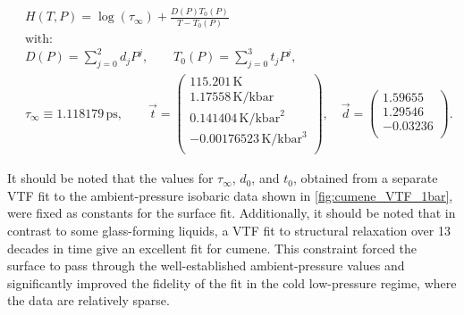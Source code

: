 \begin{equation}
	\label{eqn:VTFsurface}
	\begin{split}
		\:& H\left(T,P\right) = \log(\tau_{\infty}) +\frac{D(P)T_{0}(P)}{T-T_{0}(P)}\\
		&\text{with:}\\
		&D(P)=\sum_{j=0}^{2}d_{j}P^{j}, \qquad T_{0}(P)=\sum_{j=0}^{3}t_{j}P^{j},\\
		&\tau_{\infty}\equiv 1.118179 \,\si{\pico\second},\qquad
		\vec{t}=\begin{pmatrix}
			115.201 \,\si{\kelvin}\\
			1.17558 \,\si{\kelvin\per\kilo\bar}\\ 
			0.141404\,\si{\kelvin\per\kilo\bar\squared}\\ 
			-0.00176523\,\si{\kelvin\per\kilo\bar\cubed}\\ 
		\end{pmatrix},\quad
		\vec{d}=\begin{pmatrix}
			1.59655\\
			1.29546 \\ 
			-0.03236 \\
		\end{pmatrix}.
	\end{split}
\end{equation}

It should be noted that the values for $\tau_{\infty}$, $d_{0}$, and $t_{0}$, obtained from a separate VTF fit to the ambient-pressure isobaric data shown in \fig \ref{fig:cumene_VTF_1bar}, were fixed as constants for the surface fit. Additionally, it should be noted that in contrast to some glass-forming liquids, a VTF fit to structural relaxation over 13 decades in time give an excellent fit for cumene. This constraint forced the surface to pass through the well-established ambient-pressure values and significantly improved the fidelity of the fit in the cold low-pressure regime, where the data are relatively sparse.  


